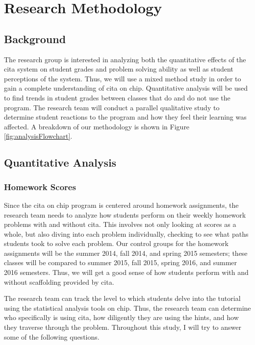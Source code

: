 \chapter[Research Methodology]{Research Methodology}

\section{Background}

The research group is interested in analyzing both the quantitative effects of the \gls{cita} system on student grades and problem solving ability as well as student perceptions of the system. Thus, we will use a mixed method study in order to gain a complete understanding of \gls{cita} on \gls{chip}. Quantitative analysis will be used to find trends in student grades between classes that do and do not use the program. The research team will conduct a parallel qualitative study to determine student reactions to the program and how they feel their learning was affected. A breakdown of our methodology is shown in Figure \ref{fig:analysisFlowchart}.

\section{Quantitative Analysis}

\subsection{Homework Scores}

Since the \gls{cita} on \gls{chip} program is centered around homework assignments, the research team needs to analyze how students perform on their weekly homework problems with and without \gls{cita}. This involves not only looking at scores as a whole, but also diving into each problem individually, checking to see what paths students took to solve each problem. Our control groups for the homework assignments will be the summer 2014, fall 2014, and spring 2015 semesters; these classes will be compared to summer 2015, fall 2015, spring 2016, and summer 2016 semesters. Thus, we will get a good sense of how students perform with and without scaffolding provided by \gls{cita}.

The research team can track the level to which students delve into the tutorial using the statistical analysis tools on \gls{chip}. Thus, the research team can determine who specifically is using \gls{cita}, how diligently they are using the hints, and how they traverse through the problem. Throughout this study, I will try to answer some of the following questions.

